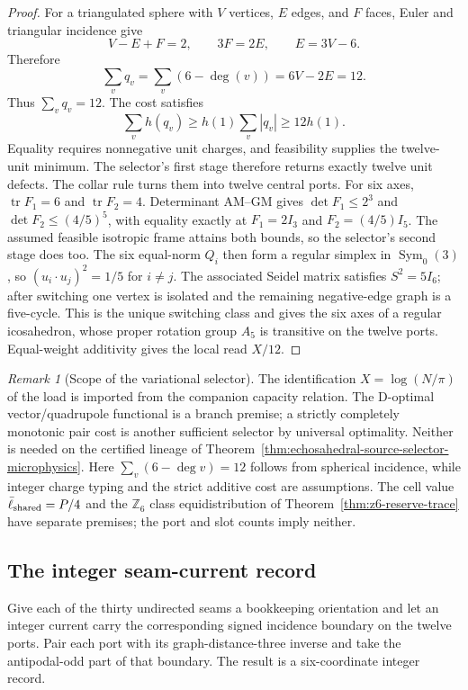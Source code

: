 \documentclass[11pt]{article}
\theoremstyle{remark}
\newtheorem{remark}[theorem]{Remark}
\theoremstyle{plain}
\begin{document}
\begin{proof}
For a triangulated sphere with \(V\) vertices, \(E\) edges, and \(F\) faces,
Euler and triangular incidence give
\[
V-E+F=2,\qquad 3F=2E,\qquad E=3V-6.
\]
Therefore
\[
\sum_v q_v
=
\sum_v(6-\deg(v))
=6V-2E
=12.
\]
Thus \(\sum_vq_v=12\). The cost satisfies
\[
 \sum_vh(q_v)\ge h(1)\sum_v|q_v|\ge12h(1).
\]
Equality requires nonnegative unit charges, and feasibility supplies the
twelve-unit minimum.  The selector's first stage therefore returns exactly
twelve unit defects. The collar rule turns them into twelve central ports.
For six axes, \(\operatorname{tr}F_1=6\) and
\(\operatorname{tr}F_2=4\). Determinant AM--GM gives
\(\det F_1\le2^3\) and \(\det F_2\le(4/5)^5\), with equality exactly at
\(F_1=2I_3\) and \(F_2=(4/5)I_5\).  The assumed feasible isotropic frame
attains both bounds, so the selector's second stage does too. The six
equal-norm \(Q_i\) then form a
regular simplex in \(\operatorname{Sym}_0(3)\), so
\((u_i\cdot u_j)^2=1/5\) for \(i\ne j\). The associated Seidel matrix satisfies
\(S^2=5I_6\); after switching one vertex is isolated and the remaining
negative-edge graph is a five-cycle. This is the unique switching class and
gives the six axes of a regular icosahedron, whose proper
rotation group \(A_5\) is transitive on the twelve ports. Equal-weight
additivity gives the local read \(X/12\).
\end{proof}

\begin{remark}[Scope of the variational selector]
The identification \(X=\log(N/\pi)\) of the load is imported from the
companion capacity relation. The D-optimal vector/quadrupole functional is a
branch premise; a strictly completely monotonic pair cost is another
sufficient selector by universal optimality. Neither is needed on the
certified lineage of
Theorem~\ref{thm:echosahedral-source-selector-microphysics}. Here
\(\sum_v(6-\deg v)=12\) follows from spherical incidence, while integer charge
typing and the strict additive cost are assumptions. The cell value
\(\bar\ell_{\rm shared}=P/4\) and the \(\mathbb Z_6\) class equidistribution
of Theorem~\ref{thm:z6-reserve-trace} have separate premises; the port and
slot counts imply neither.
\end{remark}

\subsection{The integer seam-current record}

Give each of the thirty undirected seams a bookkeeping orientation and let an
integer current carry the corresponding signed incidence boundary on the
twelve ports. Pair each port with its graph-distance-three inverse and take
the antipodal-odd part of that boundary. The result is a six-coordinate
integer record.
\end{document}
